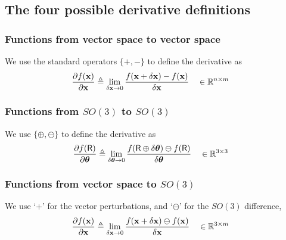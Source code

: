 
\subsection{The four possible derivative definitions}



\subsubsection{Functions from vector space to vector space}

We use the standard operators $\{+,-\}$ to define the derivative as
%
\begin{align}
\frac{\partial f({\bf x})}{\partial{\bf x}} &\triangleq \lim_{\delta{\bf x}\to0}\frac{f({\bf x}+\delta{\bf x})-f({\bf x})}{\delta{\bf x}} &&\in {\mathbb R}^{n\times m} \label{equ:derivative_vector}
\end{align}

\subsubsection{Functions from $SO(3)$ to $SO(3)$}

We use $\{\oplus,\ominus\}$ to define the derivative as
%
\begin{align}
\frac{\partial f(\mathsf R)}{\partial{{\bm \theta}}} 
&\triangleq \lim_{\delta{{\bm \theta}}\to0}\frac{f(\mathsf R\oplus\delta{{\bm \theta}})\ominus f(\mathsf R)}{\delta{{\bm \theta}}}  && \in {\mathbb R}^{3\times 3}
\label{equ:derivative_SO3}
\end{align}

\subsubsection{Functions from vector space to $SO(3)$}

We use `+' for the vector perturbations, and `$\ominus$' for the $SO(3)$ difference,
%
\begin{align}
\frac{\partial f({\bf x})}{\partial{\bf x}} &\triangleq \lim_{\delta{\bf x}\to0} \frac{ f({\bf x}+\delta{\bf x})\ominus f({\bf x})}{\delta{\bf x}} && \in {\mathbb R}^{3\times m} \label{equ:dif_RtoSO3}
\end{align}
%

